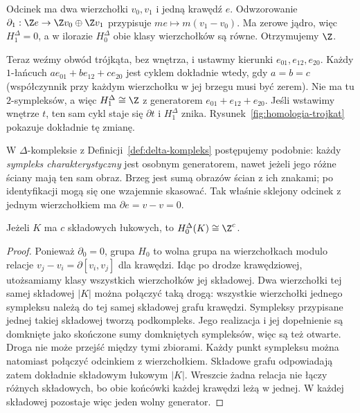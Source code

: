 \begin{przyklad}
\label{prz:homologia-odcinek-okrag}
Odcinek ma dwa wierzchołki $v_0,v_1$
i jedną krawędź $e$. Odwzorowanie
$\partial_1:\Z e\to\Z v_0\oplus\Z v_1$
przypisuje $me\mapsto m(v_1-v_0)$.
Ma zerowe jądro, więc $H_1^\Delta=0$,
a w ilorazie $H_0^\Delta$ obie klasy
wierzchołków są równe. Otrzymujemy $\Z$.

Teraz weźmy obwód trójkąta, bez wnętrza,
i ustawmy kierunki $e_{01},e_{12},e_{20}$.
Każdy $1$-łańcuch
$ae_{01}+be_{12}+ce_{20}$ jest cyklem
dokładnie wtedy, gdy $a=b=c$
(współczynnik przy każdym wierzchołku
w jej brzegu musi być zerem).
Nie ma tu $2$-sympleksów, a więc
$H_1^\Delta\cong\Z$ z generatorem
$e_{01}+e_{12}+e_{20}$.
Jeśli wstawimy wnętrze $t$, ten sam
cykl staje się $\partial t$ i
$H_1^\Delta$ znika. Rysunek~\ref{fig:homologia-trojkat}
pokazuje dokładnie tę zmianę.
\end{przyklad}

W $\Delta$-kompleksie z
Definicji~\ref{def:delta-kompleks} postępujemy
podobnie: każdy \emph{sympleks charakterystyczny}
jest osobnym generatorem, nawet jeżeli jego
różne ściany mają ten sam obraz. Brzeg
jest sumą obrazów ścian z ich znakami;
po identyfikacji mogą się one wzajemnie
skasować. Tak właśnie sklejony odcinek
z jednym wierzchołkiem ma $\partial e=v-v=0$.

\begin{stwierdzenie}[Składowe i $H_0$]
\label{prop:h0-symplicjalne}
Jeżeli $K$ ma $c$ składowych łukowych,
to $H_0^\Delta(K)\cong\Z^c$.
\end{stwierdzenie}
\begin{proof}
Ponieważ $\partial_0=0$, grupa $H_0$
to wolna grupa na wierzchołkach
modulo relacje
$v_j-v_i=\partial[v_i,v_j]$
dla krawędzi. Idąc po drodze krawędziowej,
utożsamiamy klasy wszystkich wierzchołków
jej składowej. Dwa wierzchołki tej samej
składowej $|K|$ można połączyć taką drogą:
wszystkie wierzchołki jednego sympleksu należą do tej samej
składowej grafu krawędzi. Sympleksy przypisane jednej takiej
składowej tworzą podkompleks. Jego realizacja i jej dopełnienie
są domknięte jako skończone sumy domkniętych sympleksów,
więc są też otwarte. Droga nie może przejść między tymi zbiorami.
Każdy punkt sympleksu można natomiast połączyć odcinkiem z wierzchołkiem.
Składowe grafu odpowiadają zatem dokładnie składowym łukowym $|K|$. Wreszcie żadna
relacja nie łączy różnych składowych,
bo obie końcówki każdej krawędzi leżą
w jednej. W każdej składowej pozostaje
więc jeden wolny generator.
\end{proof}

